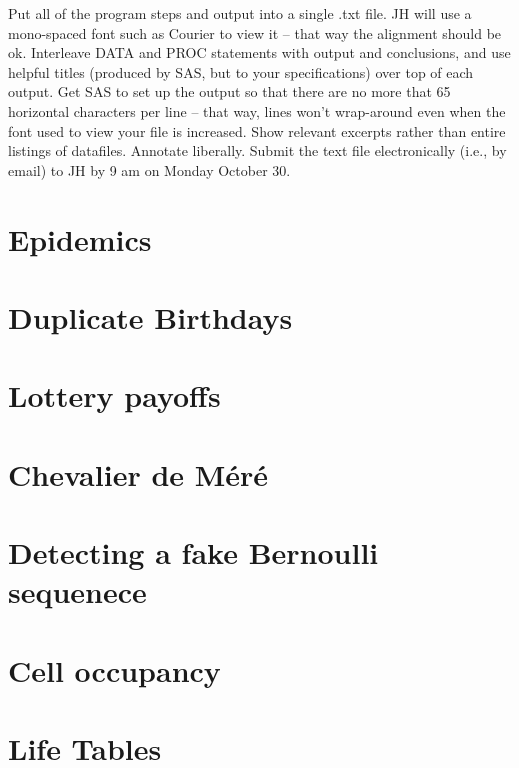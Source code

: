 \documentclass[]{book}
\begin{document}
Put all of the program steps and output into a single .txt file. JH will use a mono-spaced font such as Courier to view it -- that way the alignment should be ok. Interleave DATA and PROC statements with output and conclusions, and use helpful titles (produced by SAS, but to your specifications) over top of each output. Get SAS to set up the output so that there are no more that 65 horizontal characters per line -- that way, lines won't wrap-around even when the font used to view your file is increased. Show relevant excerpts rather than entire listings of datafiles. Annotate liberally. Submit the text file electronically (i.e., by email) to JH by 9 am on Monday October 30.

\hypertarget{epidemics}{%
\section{Epidemics}\label{epidemics}}

\hypertarget{duplicate-birthdays}{%
\section{Duplicate Birthdays}\label{duplicate-birthdays}}

\hypertarget{lottery-payoffs}{%
\section{Lottery payoffs}\label{lottery-payoffs}}

\hypertarget{chevalier-de-muxe9ruxe9}{%
\section{Chevalier de Méré}\label{chevalier-de-muxe9ruxe9}}

\hypertarget{detecting-a-fake-bernoulli-sequenece}{%
\section{Detecting a fake Bernoulli sequenece}\label{detecting-a-fake-bernoulli-sequenece}}

\hypertarget{cell-occupancy}{%
\section{Cell occupancy}\label{cell-occupancy}}

\hypertarget{life-tables}{%
\section{Life Tables}\label{life-tables}}
\end{document}
